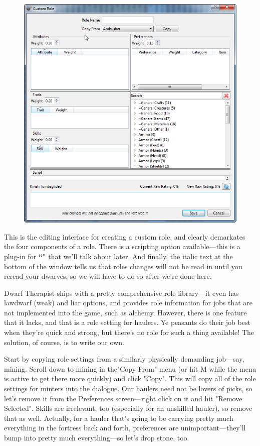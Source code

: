 \documentclass[]{article}
\begin{document}
\begin{figure}[h!]
\centering
\includegraphics[scale=.85]{Sec3Fig8}
\end{figure}

\newpage
This is the editing interface for creating a custom role, and clearly demarkates the four components of a
role. There is a scripting option available---this is a plug-in for \textbf{``"} that we'll talk about later. And finally, the italic text at the bottom of the window tells us
that roles changes will not be read in until you reread your dwarves, so we will have to do so after
we're done here.

Dwarf Therapist ships with a pretty comprehensive role library---it even has lawdwarf (weak) and liar
options, and provides role information for jobs that are not implemented into the game, such as alchemy.
However, there is one feature that it lacks, and that is a role setting for haulers. Ye peasants do their
job best when they're quick and strong, but there's no role for such a thing available! The solution, of
course, is to write our own.

Start by copying role settings from a similarly physically demanding job---say, mining. Scroll down to
mining in the"Copy From" menu (or hit M while the menu is active to get there more quickly) and click
"Copy". This will copy all of the role settings for minters into the dialogue. Our haulers need not be
lovers of picks, so let's remove it from the Preferences screen---right click on it and hit "Remove
Selected". Skills are irrelevant, too (especially for an unskilled hauler), so remove that as well.
Actually, for a hauler that's going to be carrying pretty much everything in the fortress back and forth,
preferences are unimportant---they'll bump into pretty much everything---so let's drop stone, too.
\end{document}
